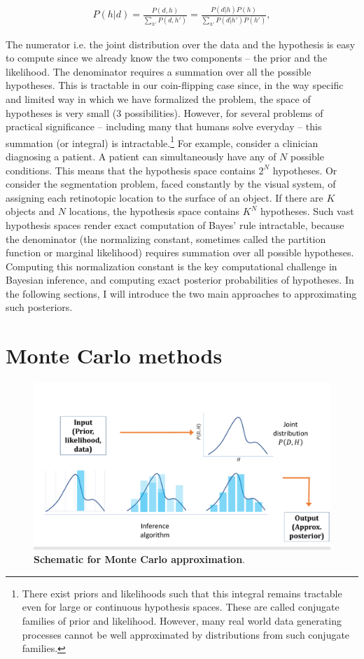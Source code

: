 \begin{align}
    P(h|d) = \frac{P(d, h)}{\sum_{h'} P(d, h')} = \frac{P(d|h)P(h)}{\sum_{h'} P(d|h') P(h')},
\end{align}

The numerator i.e. the joint distribution over the data and the hypothesis is easy to compute since we already know the two components -- the prior and the likelihood. The denominator requires a summation over all the possible hypotheses. This is tractable in our coin-flipping case since, in the way specific and limited way in which we have formalized the problem, the space of hypotheses is very small (3 possibilities). However, for several problems of practical significance -- including many that humans solve everyday -- this summation (or integral) is intractable.\footnote{There exist priors and likelihoods such that this integral remains tractable even for large or continuous hypothesis spaces. These are called conjugate families of prior and likelihood. However, many real world data generating processes cannot be well approximated by distributions from such conjugate families.}  For example, consider a clinician diagnosing a patient. A patient can simultaneously have any of $N$ possible conditions. This means that the hypothesis space contains $2^N$ hypotheses. Or consider the segmentation problem, faced constantly by the visual system, of assigning each retinotopic location to the surface of an object. If there are $K$ objects and $N$ locations, the hypothesis space contains $K^N$ hypotheses. Such vast hypothesis spaces render exact computation of Bayes' rule intractable, because the denominator (the normalizing constant, sometimes called the partition function or marginal likelihood) requires summation over all possible hypotheses. Computing this normalization constant is the key computational challenge in Bayesian inference, and computing exact posterior probabilities of hypotheses. In the following sections, I will introduce the two main approaches to approximating such posteriors.

\section{Monte Carlo methods}
\label{sec:approx_MC}

\begin{figure}
\centering
\includegraphics[width = \textwidth]{figures/MonteCarlo_schematic.pdf}
\caption{\textbf{Schematic for Monte Carlo approximation}. }
\label{fig:MC_schematic}
\end{figure}

